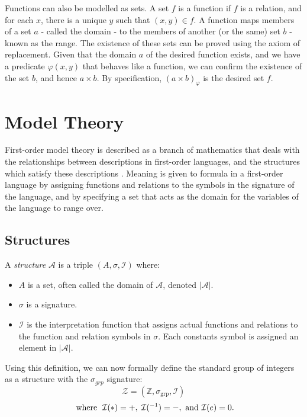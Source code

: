 \documentclass[11pt]{report}
\theoremstyle{definition}
\theoremstyle{theorem}
\theoremstyle{lemma}
\begin{document}
Functions can also be modelled as sets.
A set $f$ is a function if $f$ is a relation, and for each $x$, there is a unique $y$ such that $(x,y)\in f$.
A function maps members of a set $a$ - called the domain - to the members of another (or the same) set $b$ - known as the range.
The existence of these sets can be proved using the axiom of replacement.
Given that the domain $a$ of the desired function exists, and we have a predicate $\varphi(x,y)$ that behaves like a function, we can confirm the existence of the set $b$, and hence $a\times b$.
By specification, $(a\times b)_\varphi$ is the desired set $f$.

\section{Model Theory}
First-order model theory is described as a branch of mathematics that deals with the relationships between descriptions in first-order languages, and the structures which satisfy these descriptions \cite{stanmodel}.
Meaning is given to formula in a first-order language by assigning functions and relations to the symbols in the signature of the language, and by specifying a set that acts as the domain for the variables of the language to range over.

\subsection{Structures}
A \emph{structure} \cite[ch.~2.1]{selinger} $\mathcal{A}$ is a triple $(A, \sigma,\mathcal{I})$ where:
\begin{itemize}
  \item $A$ is a set, often called the domain of $\mathcal{A}$, denoted $|\mathcal{A}|$.
  \item $\sigma$ is a signature.
  \item $\mathcal I$ is the interpretation function that assigns actual functions and relations to the function and relation symbols in $\sigma$. Each constants symbol is  assigned an element in $|\mathcal{A}|$.
\end{itemize}
Using this definition, we can now formally define the standard group of integers as a structure with the $\sigma_{\mathit{grp}}$ signature:
$$\mathcal{Z} = (\mathbb{Z}, \sigma_{\text{grp}}, \mathcal{I})$$
$$\text{ where \hspace{1mm}} \mathcal{I}(*) = +,\hspace{1mm} \mathcal{I}(^{-1}) = -, \text{ and } \mathcal{I}(e) = 0.$$
\end{document}
